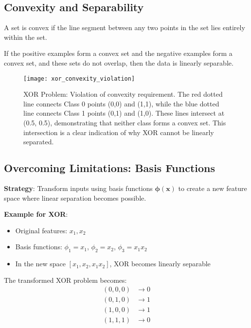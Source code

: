 \subsection{Convexity and Separability}

\begin{definition}
A set is convex if the line segment between any two points in the set lies entirely within the set.
\end{definition}

\begin{theorem}
If the positive examples form a convex set and the negative examples form a convex set, and these sets do not overlap, then the data is linearly separable.
\end{theorem}

\begin{figure}[h]
    \centering
    \texttt{[image: xor\_convexity\_violation]}
    \caption{XOR Problem: Violation of convexity requirement. The red dotted line connects Class 0 points (0,0) and (1,1), while the blue dotted line connects Class 1 points (0,1) and (1,0). These lines intersect at (0.5, 0.5), demonstrating that neither class forms a convex set. This intersection is a clear indication of why XOR cannot be linearly separated.}
    \label{fig:xor_convexity_violation}
\end{figure}

\subsection{Overcoming Limitations: Basis Functions}

\textbf{Strategy}: Transform inputs using basis functions $\bm{\phi}(\bm{x})$ to create a new feature space where linear separation becomes possible.

\textbf{Example for XOR}:
\begin{itemize}
    \item Original features: $x_1, x_2$
    \item Basis functions: $\phi_1 = x_1$, $\phi_2 = x_2$, $\phi_3 = x_1 x_2$
    \item In the new space $[x_1, x_2, x_1 x_2]$, XOR becomes linearly separable
\end{itemize}

The transformed XOR problem becomes:
\begin{align}
(0,0,0) &\rightarrow 0 \\
(0,1,0) &\rightarrow 1 \\
(1,0,0) &\rightarrow 1 \\
(1,1,1) &\rightarrow 0
\end{align}

